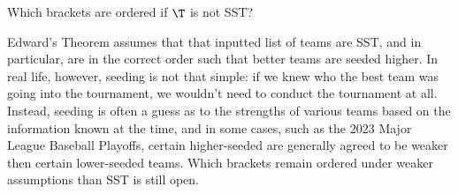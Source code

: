 {\begin{oq}{}{}
    Which brackets are ordered if $\T$ is not SST?
\end{oq}

Edward's Theorem assumes that that inputted list of teams are SST, and in particular, are in the correct order such that better teams are seeded higher. In real life, however, seeding is not that simple: if we knew who the best team was going into the tournament, we wouldn't need to conduct the tournament at all. Instead, seeding is often a guess as to the strengths of various teams based on the information known at the time, and in some cases, such as the 2023 Major League Baseball Playoffs, certain higher-seeded are generally agreed to be weaker then certain lower-seeded teams. Which brackets remain ordered under weaker assumptions than SST is still open.
}